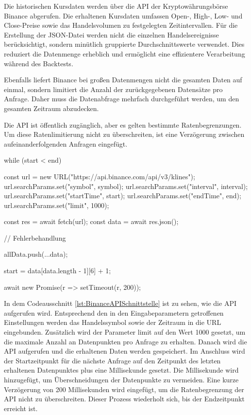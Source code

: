 Die historischen Kursdaten werden über die API der Kryptowährungsbörse Binance abgerufen.
Die erhaltenen Kursdaten umfassen Open-, High-, Low- und Close-Preise sowie das Handelsvolumen zu festgelegten Zeitintervallen. \cite{Binance}
Für die Erstellung der JSON-Datei werden nicht die einzelnen Handelsereignisse berücksichtigt, sondern minütlich gruppierte Durchschnittswerte verwendet.
Dies reduziert die Datenmenge erheblich und ermöglicht eine effizientere Verarbeitung während des Backtests.

Ebenfalls liefert Binance bei großen Datenmengen nicht die gesamten Daten auf einmal, sondern limitiert die Anzahl der zurückgegebenen Datensätze pro Anfrage.
Daher muss die Datenabfrage mehrfach durchgeführt werden, um den gesamten Zeitraum abzudecken.

Die API ist öffentlich zugänglich, aber es gelten bestimmte Ratenbegrenzungen.
Um diese Ratenlimitierung nicht zu überschreiten, ist eine Verzögerung zwischen aufeinanderfolgenden Anfragen eingefügt.

\begin{JsCode}[caption={Aufruf der Binance API Schnittstelle}, label={lst:BinanceAPISchnittstelle}]
    while (start < end) {
        const url = new URL("https://api.binance.com/api/v3/klines");
        url.searchParams.set("symbol", symbol);
        url.searchParams.set("interval", interval);
        url.searchParams.set("startTime", start);
        url.searchParams.set("endTime", end);
        url.searchParams.set("limit", 1000);

        const res = await fetch(url);
        const data = await res.json();

        // Fehlerbehandlung

        allData.push(...data);

        start = data[data.length - 1][6] + 1;

        await new Promise(r => setTimeout(r, 200));
    }
\end{JsCode}

In dem Codeausschnitt \ref{lst:BinanceAPISchnittstelle} ist zu sehen, wie die API aufgerufen wird.
Entsprechend den in den Eingabeparametern getroffenen Einstellungen werden das Handelssymbol sowie der Zeitraum in die URL eingebunden.
Zusätzlich wird der Parameter limit auf den Wert 1000 gesetzt, um die maximale Anzahl an Datenpunkten pro Anfrage zu erhalten.
Danach wird die API aufgerufen und die erhaltenen Daten werden gespeichert.
Im Anschluss wird der Startzeitpunkt für die nächste Anfrage auf den Zeitpunkt des letzten erhaltenen Datenpunktes plus eine Millisekunde gesetzt.
Die Millisekunde wird hinzugefügt, um Überschneidungen der Datenpunkte zu vermeiden.
Eine kurze Verzögerung von 200 Millisekunden wird eingefügt, um die Ratenbegrenzung der API nicht zu überschreiten.
Dieser Prozess wiederholt sich, bis der Endzeitpunkt erreicht ist.

